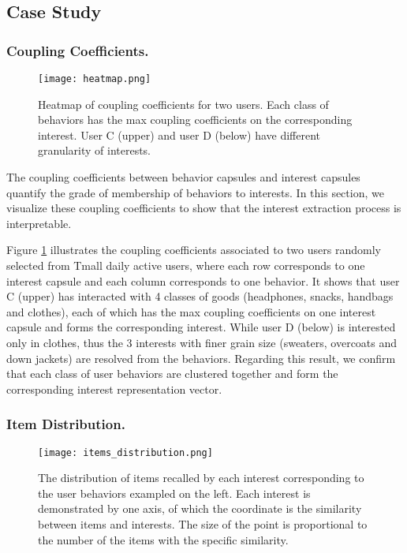 \documentclass[sigconf]{acmart}
\begin{document}
\subsection{Case Study}

\subsubsection{Coupling Coefficients.}

\begin{figure}[ht]
  \centering
  \texttt{[image: heatmap.png]}
  \caption{Heatmap of coupling coefficients for two users. Each class of behaviors has the max coupling coefficients on the corresponding interest. User C (upper) and user D (below) have different granularity of interests.}
  \label{fig:heatmap}
\end{figure}

The coupling coefficients between behavior capsules and interest capsules quantify the grade of membership of behaviors to interests.
In this section, we visualize these coupling coefficients to show that the interest extraction process is interpretable.

Figure \ref{fig:heatmap} illustrates the coupling coefficients associated to two users randomly selected from Tmall daily active users, where each row corresponds to one interest capsule and each column corresponds to one behavior.
It shows that user C (upper) has interacted with 4 classes of goods (headphones, snacks, handbags and clothes), each of which has the max coupling coefficients on one interest capsule and forms the corresponding interest.
While user D (below) is interested only in clothes, thus the 3 interests with finer grain size (sweaters, overcoats and down jackets) are resolved from the behaviors.
Regarding this result, we confirm that each class of user behaviors are clustered together and form the corresponding interest representation vector.

\subsubsection{Item Distribution.}

\begin{figure}[ht]
  \centering
  \texttt{[image: items\_distribution.png]}
  \caption{The distribution of items recalled by each interest corresponding to the user behaviors exampled on the left. Each interest is demonstrated by one axis, of which the coordinate is the similarity between items and interests. The size of the point is proportional to the number of the items with the specific similarity.}
  \label{fig:distribution}
\end{figure}
\end{document}
